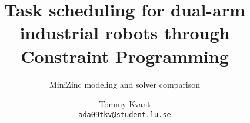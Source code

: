 \documentclass{cslthse-msc}
\author{
	Tommy Kvant \\
	{\normalsize \href{mailto:ada09tkv@student.lu.se}{\texttt{ada09tkv@student.lu.se}}}
}
\title{Task scheduling for dual-arm industrial robots through Constraint Programming}
\subtitle{MiniZinc modeling and solver comparison}
\begin{document}
\makefrontmatter









\begin{appendices}


\end{appendices}
\end{document}
